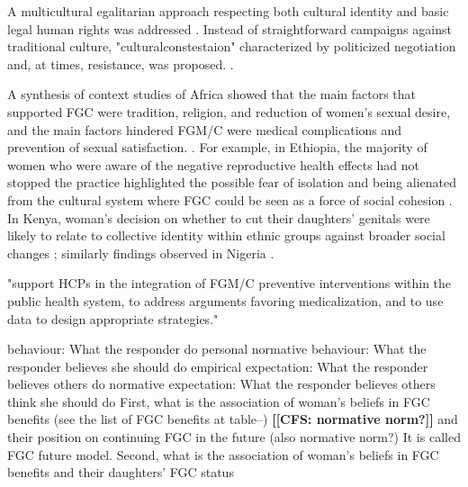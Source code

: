 \documentclass[12pt,]{article}
\newcommand{\comment}[1]{\textbf{[[#1]]}}
\newcommand{\cfcmt}[1]{\comment{CFS: #1}}
\begin{document}

A multicultural egalitarian approach respecting both cultural identity and basic legal human rights was addressed \cite{BoylCarb10, Wade11}.  Instead of straightforward campaigns against traditional culture, "culturalconstestaion" characterized by politicized negotiation and, at times, resistance, was proposed. \cite{Koom14}.

A synthesis of context studies of Africa showed that the main factors that supported FGC were tradition, religion, and reduction of women's sexual desire, and the main factors hindered FGM/C were medical complications and prevention of sexual satisfaction. \cite{BergDeni12a}.  For example, in Ethiopia, the majority of women who were aware of the negative reproductive health effects had not stopped the practice highlighted the possible fear of isolation and being alienated from the cultural system where FGC could be seen as a force of social cohesion \cite{YirgKass12}.  In Kenya, woman's decision on whether to cut their daughters' genitals were likely to relate to collective identity within ethnic groups against broader social changes \cite{Achi14, Hayf05}; similarly findings observed in Nigeria \cite{FreyJohn07, KandMwek09}.

"support HCPs in the integration of FGM/C preventive interventions within the public health system, to address arguments favoring medicalization, and to use data to design appropriate strategies." \cite{KaplRiba16}


behaviour:  What the responder do 
personal normative behaviour:  What the responder believes she should do
empirical expectation:  What the responder believes others do
normative expectation: What the responder believes others think she should do
\cite{Bicc06}
First, what is the association of woman's beliefs in FGC benefits (see the list of FGC benefits at table--) \cfcmt{normative norm?}
and their position on continuing FGC in the future (also normative norm?)  It is called FGC future model.  Second, what is the association of woman's beliefs in FGC benefits and their daughters' FGC status %
\end{document}
